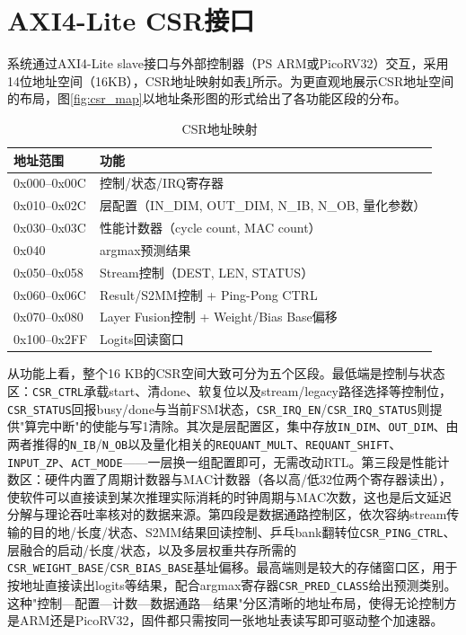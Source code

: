 \documentclass[bachelor,compact,nofont]{xjtuthesis}
\numberwithin{equation}{chapter}
\begin{document}
\section{AXI4-Lite CSR接口}

系统通过AXI4-Lite slave接口与外部控制器（PS ARM或PicoRV32）交互，采用14位地址空间（16KB），CSR地址映射如表\ref{tab:csr_map}所示。为更直观地展示CSR地址空间的布局，图\ref{fig:csr_map}以地址条形图的形式给出了各功能区段的分布。

\begin{table}[H]
	\centering
	\caption{CSR地址映射}
	\label{tab:csr_map}
	\begin{tabularx}{\textwidth}{l>{\raggedright\arraybackslash}X}
		\toprule
		地址范围 & 功能 \\
		\midrule
		0x000--0x00C & 控制/状态/IRQ寄存器 \\
		0x010--0x02C & 层配置（IN\_DIM, OUT\_DIM, N\_IB, N\_OB, 量化参数） \\
		0x030--0x03C & 性能计数器（cycle count, MAC count） \\
		0x040 & argmax预测结果 \\
		0x050--0x058 & Stream控制（DEST, LEN, STATUS） \\
		0x060--0x06C & Result/S2MM控制 + Ping-Pong CTRL \\
		0x070--0x080 & Layer Fusion控制 + Weight/Bias Base偏移 \\
		0x100--0x2FF & Logits回读窗口 \\
		\bottomrule
	\end{tabularx}
\end{table}


从功能上看，整个16 KB的CSR空间大致可分为五个区段。最低端是控制与状态区：\texttt{CSR\_CTRL}承载start、清done、软复位以及stream/legacy路径选择等控制位，\texttt{CSR\_STATUS}回报busy/done与当前FSM状态，\texttt{CSR\_IRQ\_EN}/\texttt{CSR\_IRQ\_STATUS}则提供"算完中断"的使能与写1清除。其次是层配置区，集中存放\texttt{IN\_DIM}、\texttt{OUT\_DIM}、由两者推得的\texttt{N\_IB}/\texttt{N\_OB}以及量化相关的\texttt{REQUANT\_MULT}、\texttt{REQUANT\_SHIFT}、\texttt{INPUT\_ZP}、\texttt{ACT\_MODE}——一层换一组配置即可，无需改动RTL。第三段是性能计数区：硬件内置了周期计数器与MAC计数器（各以高/低32位两个寄存器读出），使软件可以直接读到某次推理实际消耗的时钟周期与MAC次数，这也是后文延迟分解与理论吞吐率核对的数据来源。第四段是数据通路控制区，依次容纳stream传输的目的地/长度/状态、S2MM结果回读控制、乒乓bank翻转位\texttt{CSR\_PING\_CTRL}、层融合的启动/长度/状态，以及多层权重共存所需的\texttt{CSR\_WEIGHT\_BASE}/\texttt{CSR\_BIAS\_BASE}基址偏移。最高端则是较大的存储窗口区，用于按地址直接读出logits等结果，配合argmax寄存器\texttt{CSR\_PRED\_CLASS}给出预测类别。这种"控制—配置—计数—数据通路—结果"分区清晰的地址布局，使得无论控制方是ARM还是PicoRV32，固件都只需按同一张地址表读写即可驱动整个加速器。
\end{document}
